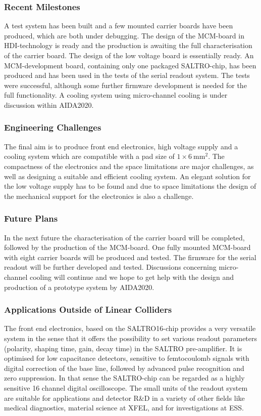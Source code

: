 \subsubsection{Recent Milestones}
A test system has been built and a few mounted carrier boards have been produced, which are both under debugging. The design of the MCM-board in HDI-technology is ready and the production is awaiting the full characterisation of the carrier board. The design of the low voltage board is essentially ready. An MCM-development board, containing only one packaged SALTRO-chip, has been produced and has been used in the tests of the serial readout system. The tests were successful, although some further firmware development is needed for the full functionality. A cooling system using micro-channel cooling is under discussion within AIDA2020.

\subsubsection{Engineering Challenges}
The final aim is to produce front end electronics, high voltage supply and a cooling system which are compatible with a pad size of $1 \times \SI{6}{\mm\squared}$. The compactness of the electronics and the space limitations are major challenges, as well as designing a suitable and efficient cooling system. An elegant solution for the low voltage supply has to be found and due to space limitations the design of the mechanical support for the electronics is also a challenge.

\subsubsection{Future Plans}
In the next future the characterisation of the carrier board will be completed, followed by the production of the MCM-board. One fully mounted MCM-board with eight carrier boards will be produced and tested. The firmware for the serial readout will be further developed and tested. Discussions concerning micro-channel cooling will continue and we hope to get help with the design and production of a prototype system by AIDA2020.

\subsubsection{Applications Outside of Linear Colliders}
The front end electronics, based on the SALTRO16-chip provides a very versatile system in the sense that it offers the possibility to set various readout parameters (polarity, shaping time, gain, decay time) in the SALTRO pre-amplifier. It is optimised for low capacitance detectors, sensitive to femtocoulomb signals with digital correction of the base line, followed by advanced pulse recognition and zero suppression.  In that sense the SALTRO-chip can be regarded as a highly sensitive 16 channel digital oscilloscope. The small units of the readout system are suitable for applications and detector R\&D in a variety of other fields like medical diagnostics, material science at XFEL, and for investigations at ESS.
